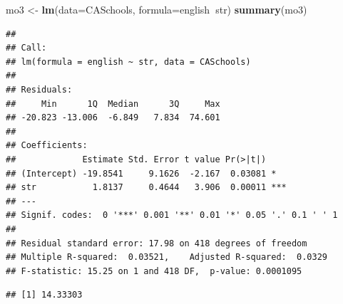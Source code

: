 \documentclass[
]{book}
\newenvironment{Shaded}{\begin{snugshade}}{\end{snugshade}}
\newcommand{\DataTypeTok}[1]{\textcolor[rgb]{0.13,0.29,0.53}{#1}}
\newcommand{\DecValTok}[1]{\textcolor[rgb]{0.00,0.00,0.81}{#1}}
\newcommand{\KeywordTok}[1]{\textcolor[rgb]{0.13,0.29,0.53}{\textbf{#1}}}
\newcommand{\NormalTok}[1]{#1}
\newcommand{\OperatorTok}[1]{\textcolor[rgb]{0.81,0.36,0.00}{\textbf{#1}}}
\newcommand{\OtherTok}[1]{\textcolor[rgb]{0.56,0.35,0.01}{#1}}
\newcommand{\StringTok}[1]{\textcolor[rgb]{0.31,0.60,0.02}{#1}}
\begin{document}
\begin{Shaded}
\begin{Highlighting}[]
\NormalTok{mo3 <-}\StringTok{ }\KeywordTok{lm}\NormalTok{(}\DataTypeTok{data=}\NormalTok{CASchools, }\DataTypeTok{formula=}\NormalTok{english}\OperatorTok{~}\NormalTok{str)}
\KeywordTok{summary}\NormalTok{(mo3)}
\end{Highlighting}
\end{Shaded}

\begin{verbatim}
## 
## Call:
## lm(formula = english ~ str, data = CASchools)
## 
## Residuals:
##     Min      1Q  Median      3Q     Max 
## -20.823 -13.006  -6.849   7.834  74.601 
## 
## Coefficients:
##             Estimate Std. Error t value Pr(>|t|)    
## (Intercept) -19.8541     9.1626  -2.167  0.03081 *  
## str           1.8137     0.4644   3.906  0.00011 ***
## ---
## Signif. codes:  0 '***' 0.001 '**' 0.01 '*' 0.05 '.' 0.1 ' ' 1
## 
## Residual standard error: 17.98 on 418 degrees of freedom
## Multiple R-squared:  0.03521,    Adjusted R-squared:  0.0329 
## F-statistic: 15.25 on 1 and 418 DF,  p-value: 0.0001095
\end{verbatim}

\begin{Shaded}
\end{Shaded}

\begin{verbatim}
## [1] 14.33303
\end{verbatim}

\begin{Shaded}
\end{Shaded}
\end{document}
